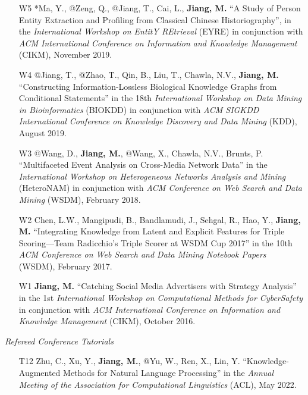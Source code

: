 \documentclass[10pt]{article}
\newenvironment{myindentpar}[1]%
{\begin{list}{}%
         {\setlength{\leftmargin}{#1}}%
         \item[]%
}
{\end{list}}
\newcounter{list}
\begin{document}
\begin{myindentpar}{0.00cm}
\begin{enumerate}[leftmargin=.5cm]
\item[W5] *Ma, Y., @Zeng, Q., @Jiang, T., Cai, L., \textbf{Jiang, M.} ``A Study of Person Entity Extraction and Profiling from Classical Chinese Historiography'', in the \textit{International Workshop on EntitY REtrieval} (EYRE) in conjunction with \textit{ACM International Conference on Information and Knowledge Management} (CIKM), November 2019.

\item[W4] @Jiang, T., @Zhao, T., Qin, B., Liu, T., Chawla, N.V., \textbf{Jiang, M.} ``Constructing Information-Lossless Biological Knowledge Graphs from Conditional Statements'' in the 18th \textit{International Workshop on Data Mining in Bioinformatics} (BIOKDD) in conjunction with \textit{ACM SIGKDD International Conference on Knowledge Discovery and Data Mining} (KDD), August 2019.

\item[W3] @Wang, D., \textbf{Jiang, M.}, @Wang, X., Chawla, N.V., Brunts, P. ``Multifaceted Event Analysis on Cross-Media Network Data'' in the \textit{International Workshop on Heterogeneous Networks Analysis and Mining} (HeteroNAM) in conjunction with \textit{ACM Conference on Web Search and Data Mining} (WSDM), February 2018.

\item[W2] Chen, L.W., Mangipudi, B., Bandlamudi, J., Sehgal, R., Hao, Y., \textbf{Jiang, M.} ``Integrating Knowledge from Latent and Explicit Features for Triple Scoring—Team Radicchio's Triple Scorer at WSDM Cup 2017'' in the 10th \textit{ACM Conference on Web Search and Data Mining Notebook Papers} (WSDM), February 2017.

\item[W1] \textbf{Jiang, M.} ``Catching Social Media Advertisers with Strategy Analysis'' in the 1st \textit{International Workshop on Computational Methods for CyberSafety} in conjunction with \textit{ACM International Conference on Information and Knowledge Management} (CIKM), October 2016.

\end{enumerate}

\hspace{-0.25cm}\textit{Refereed Conference Tutorials}

\begin{enumerate}[leftmargin=.5cm]

\item[T12] Zhu, C., Xu, Y., \textbf{Jiang, M.}, @Yu, W., Ren, X., Lin, Y. ``Knowledge-Augmented Methods for Natural Language Processing'' in the \textit{Annual Meeting of the Association for Computational Linguistics} (ACL), May 2022.


\end{enumerate}
\end{myindentpar}
\end{document}
